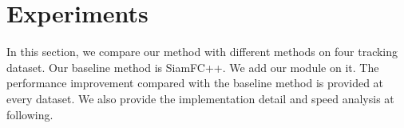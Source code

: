 \documentclass[journal]{IEEEtran}
\begin{document}

\section{Experiments}

In this section, we compare our method with different methods on four tracking dataset. 
Our baseline method is SiamFC++. We add our module on it. The performance improvement compared with the baseline method is provided at every dataset. We also provide the implementation detail and speed analysis at following.
\end{document}
